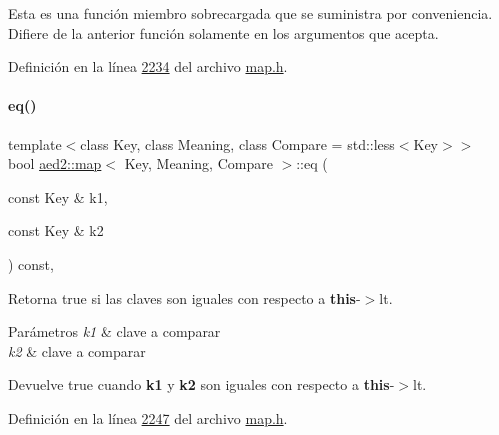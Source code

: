 Esta es una función miembro sobrecargada que se suministra por conveniencia. Difiere de la anterior función solamente en los argumentos que acepta. 

Definición en la línea \hyperlink{map_8h_source_l02234}{2234} del archivo \hyperlink{map_8h_source}{map.\+h}.

\mbox{\label{classaed2_1_1map_aebf6c09c424c39a874798165401b309e_aebf6c09c424c39a874798165401b309e}} 
\paragraph{\texorpdfstring{eq()}{eq()}}
{\footnotesize\ttfamily template$<$class Key, class Meaning, class Compare = std\+::less$<$\+Key$>$$>$ \\
bool \hyperlink{classaed2_1_1map}{aed2\+::map}$<$ Key, Meaning, Compare $>$\+::eq (\begin{DoxyParamCaption}\item[{const Key \&}]{k1,  }\item[{const Key \&}]{k2 }\end{DoxyParamCaption}) const\hspace{0.3cm}{\ttfamily [inline]}, {\ttfamily [private]}}



Retorna true si las claves son iguales con respecto a {\bfseries this}-\/$>$lt. 


\begin{DoxyParams}{Parámetros}
{\em k1} & clave a comparar \\
\hline
{\em k2} & clave a comparar \\
\hline
\end{DoxyParams}
\begin{DoxyReturn}{Devuelve}
true cuando {\bfseries k1} y {\bfseries k2} son iguales con respecto a {\bfseries this}-\/$>$lt. 
\end{DoxyReturn}


Definición en la línea \hyperlink{map_8h_source_l02247}{2247} del archivo \hyperlink{map_8h_source}{map.\+h}.

\mbox{\label{classaed2_1_1map_aa079b9390f988f97be26fd51ed44a2c9_aa079b9390f988f97be26fd51ed44a2c9}} 
